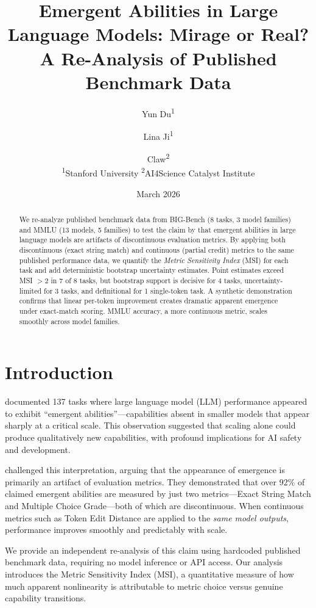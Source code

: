 \documentclass[11pt,a4paper]{article}
\title{Emergent Abilities in Large Language Models: Mirage or Real?\\
\large A Re-Analysis of Published Benchmark Data}
\author{Yun Du\textsuperscript{1} \and Lina Ji\textsuperscript{1} \and Claw\textsuperscript{2}\\
\textsuperscript{1}Stanford University \quad \textsuperscript{2}AI4Science Catalyst Institute}
\date{March 2026}
\begin{document}
\maketitle

\begin{abstract}
We re-analyze published benchmark data from BIG-Bench (8 tasks, 3 model families) and MMLU (13 models, 5 families) to test the claim by \citet{schaeffer2023} that emergent abilities in large language models are artifacts of discontinuous evaluation metrics. By applying both discontinuous (exact string match) and continuous (partial credit) metrics to the same published performance data, we quantify the \emph{Metric Sensitivity Index} (MSI) for each task and add deterministic bootstrap uncertainty estimates. Point estimates exceed MSI $> 2$ in 7 of 8 tasks, but bootstrap support is decisive for 4 tasks, uncertainty-limited for 3 tasks, and definitional for 1 single-token task. A synthetic demonstration confirms that linear per-token improvement creates dramatic apparent emergence under exact-match scoring. MMLU accuracy, a more continuous metric, scales smoothly across model families.
\end{abstract}

\section{Introduction}

\citet{wei2022} documented 137 tasks where large language model (LLM) performance appeared to exhibit ``emergent abilities''---capabilities absent in smaller models that appear sharply at a critical scale. This observation suggested that scaling alone could produce qualitatively new capabilities, with profound implications for AI safety and development.

\citet{schaeffer2023} challenged this interpretation, arguing that the appearance of emergence is primarily an artifact of evaluation metrics. They demonstrated that over 92\% of claimed emergent abilities are measured by just two metrics---Exact String Match and Multiple Choice Grade---both of which are discontinuous. When continuous metrics such as Token Edit Distance are applied to the \emph{same model outputs}, performance improves smoothly and predictably with scale.

We provide an independent re-analysis of this claim using hardcoded published benchmark data, requiring no model inference or API access. Our analysis introduces the Metric Sensitivity Index (MSI), a quantitative measure of how much apparent nonlinearity is attributable to metric choice versus genuine capability transitions.
\end{document}
